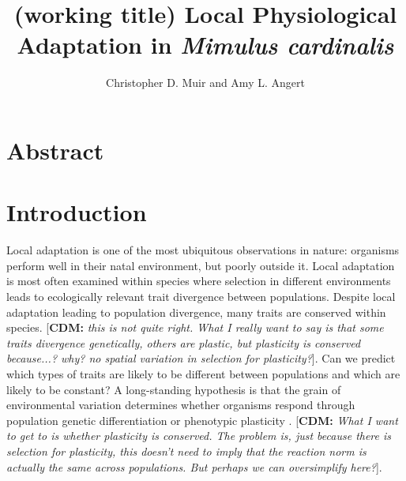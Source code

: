 \documentclass[11pt, oneside]{article}
\title{(working title) Local Physiological Adaptation in \textit{Mimulus cardinalis}}
\author{Christopher D. Muir and Amy L. Angert}
\newcommand{\cdm}[1]{{ \color{magenta} [{\bf{CDM:}} {\em#1}]}} %
\begin{document}
\maketitle

\section*{Abstract}

\section*{Introduction}


Local adaptation is one of the most ubiquitous observations in nature: organisms perform well in their natal environment, but poorly outside it. Local adaptation is most often examined within species where selection in different environments leads to ecologically relevant trait divergence between populations. Despite local adaptation leading to population divergence, many traits are conserved within species. \cdm{this is not quite right. What I really want to say is that some traits divergence genetically, others are plastic, but plasticity is conserved because...? why? no spatial variation in selection for plasticity?}. Can we predict which types of traits are likely to be different between populations and which are likely to be constant? A long-standing hypothesis is that the grain of environmental variation determines whether organisms respond through population genetic differentiation or phenotypic plasticity \citep{}. \cdm{What I want to get to is whether plasticity is conserved. The problem is, just because there is selection for plasticity, this doesn't need to imply that the reaction norm is actually the same across populations. But perhaps we can oversimplify here?}. 
\end{document}
